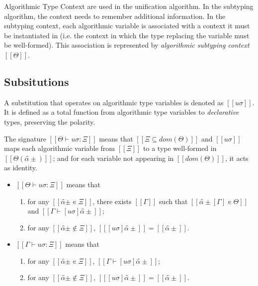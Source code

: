 \documentclass[acmsmall,natbib=false,review,anonymous]{acmart}
\begin{document}
Algorithmic Type Context are used in the unification algorithm.
In the subtyping algorithm, 
the context needs to remember additional information.
In the subtyping context, each algorithmic variable is associated with a
context it must be instantiated in 
(i.e. the context in which the type replacing the variable must be well-formed).
This association is represented by \emph{algorithmic subtyping context} $[[Θ]]$.


\subsection{Subsitutions}

A substitution that operates on algorithmic type variables is denoted as
$[[uσ]]$. It is defined as a total function from algorithmic 
type variables to \emph{declarative} types, preserving the polarity.

The signature $[[Θ ⊢ uσ : Ξ]]$ means that
$[[Ξ ⊆ dom(Θ)]]$ and 
$[[uσ]]$ maps each algorithmic variable 
from $[[Ξ]]$ to a type well-formed in $[[Θ(α̂±)]]$;
and for each variable not appearing in $[[dom(Θ)]]$, 
it acts as identity.

\begin{definition}
  \label{def:algo-subst-sig}
  \hfill
  \begin{itemize}
    \item $[[Θ ⊢ uσ : Ξ]]$ means that
      \begin{enumerate}
        \item for any $[[α̂± ∊ Ξ]]$,
          there exists $[[Γ]]$ such that $[[ α̂±[Γ] ∊ Θ ]]$
          and $[[ Γ ⊢ [uσ]α̂± ]]$; 
        \item for any $[[ α̂± ∉ Ξ]]$, $[[ [uσ]α̂± ]] =  [[ α̂± ]]$.
      \end{enumerate}
    \item $[[Γ ⊢ uσ : Ξ]]$ means that
      \begin{enumerate}
        \item for any $[[α̂± ∊ Ξ]]$, $[[ Γ ⊢ [uσ]α̂± ]]$; 
        \item for any $[[ α̂± ∉ Ξ]]$, $[[ [uσ]α̂± ]] =  [[ α̂± ]]$.
      \end{enumerate}
  \end{itemize}
\end{definition}
\end{document}
